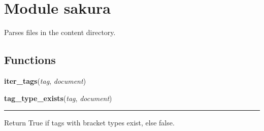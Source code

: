 %
%
%


\section{Module sakura}

    \label{sakura}
Parses files in the content directory.



  \subsection{Functions}

    \label{sakura:iter_tags}

    \vspace{0.5ex}

\hspace{.8\funcindent}\begin{boxedminipage}{\funcwidth}

    \raggedright \textbf{iter\_tags}(\textit{tag}, \textit{document})

\setlength{\parskip}{2ex}
\setlength{\parskip}{1ex}
    \end{boxedminipage}

    \label{sakura:tag_type_exists}

    \vspace{0.5ex}

\hspace{.8\funcindent}\begin{boxedminipage}{\funcwidth}

    \raggedright \textbf{tag\_type\_exists}(\textit{tag}, \textit{document})

    \vspace{-1.5ex}

    \rule{\textwidth}{0.5\fboxrule}
\setlength{\parskip}{2ex}
    Return True if tags with bracket types exist, else false.

\setlength{\parskip}{1ex}
    \end{boxedminipage}

